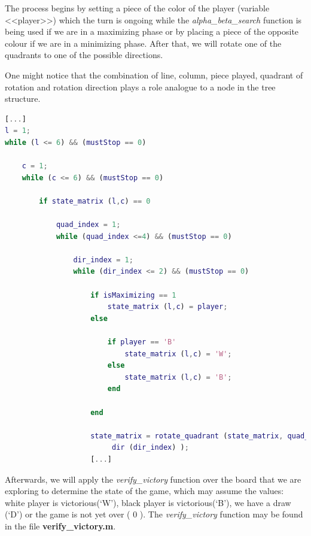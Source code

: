 The process begins by setting a piece of the color of the player (variable
<<player>>) which the turn is ongoing while the \textit{alpha\_beta\_search}
function is being used if we are in a maximizing phase or by placing a piece of
the opposite colour if we are in a minimizing phase. After that, we will rotate
one of the quadrants to one of the possible directions.

\vspace{10pt}

One might notice that the combination of line, column, piece played, quadrant
of rotation and rotation direction plays a role analogue to a node in the tree
structure.

\vspace{10pt}

\begin{lstlisting}[language=Matlab]
[...]
l = 1;
while (l <= 6) && (mustStop == 0)
    
    c = 1;
    while (c <= 6) && (mustStop == 0)
        
        if state_matrix (l,c) == 0

            quad_index = 1;
            while (quad_index <=4) && (mustStop == 0)
                
                dir_index = 1;
                while (dir_index <= 2) && (mustStop == 0)
                    
                    if isMaximizing == 1
                        state_matrix (l,c) = player;
                    else
                        
                        if player == 'B'
                            state_matrix (l,c) = 'W';
                        else
                            state_matrix (l,c) = 'B';
                        end
                        
                    end
                    
                    state_matrix = rotate_quadrant (state_matrix, quad_index,
                    	 dir (dir_index) );
                    [...]
\end{lstlisting}

\vspace{10pt}

Afterwards, we will apply the \textit{verify\_victory} function over the board
that we are exploring to determine the state of the game, which may assume the values:
white player is victorious(‘W’), black player is victorious(‘B’), we have a
draw (‘D’) or the game is not yet over ( 0 ). The \textit{verify\_victory}
function may be found in the file \textbf{verify\_victory.m}.

